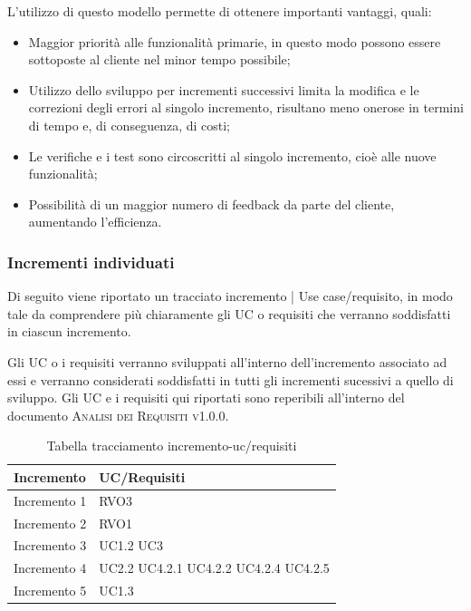 \documentclass[../piano_di_progetto.tex]{subfiles}
\begin{document}
L'utilizzo di questo modello permette di ottenere importanti vantaggi, quali:
\begin{itemize}
    \item Maggior priorità alle funzionalità primarie, in questo modo possono essere sottoposte al cliente nel minor tempo possibile;
    \item Utilizzo dello sviluppo per incrementi successivi limita la modifica e le correzioni degli errori al singolo incremento, risultano meno onerose in termini di tempo e, di conseguenza, di costi;
    \item Le verifiche e i test sono circoscritti al singolo incremento, cioè alle nuove funzionalità;
    \item Possibilità di un maggior numero di feedback da parte del cliente, aumentando l'efficienza.
\end{itemize}

\subsubsection{Incrementi individuati}
\label{ssub:incr_ind}

Di seguito viene riportato un tracciato incremento | Use case/requisito, in modo tale da comprendere più chiaramente gli UC o requisiti che verranno soddisfatti in ciascun incremento. 

Gli UC o i requisiti verranno sviluppati all'interno dell'incremento associato ad essi e verranno considerati soddisfatti in tutti gli incrementi sucessivi a quello di sviluppo. Gli UC e i requisiti qui riportati sono reperibili all'interno del documento \textsc{Analisi dei Requisiti v1.0.0}.
\begin{table}[!ht]
	\centering
	\begin{tabular}{|p{3cm}|p{3cm}|}
	\hline
	\rowcolor{lightgray}
	\textbf{Incremento} & \textbf{UC/Requisiti}\\
	\hline
        Incremento 1 & RVO3\\
        Incremento 2 & RVO1\\
        Incremento 3 & UC1.2  UC3 \\
        Incremento 4 & UC2.2 UC4.2.1 UC4.2.2 UC4.2.4 UC4.2.5\\
        Incremento 5 & UC1.3\\
	\hline	
	\end{tabular}
	\caption{Tabella tracciamento incremento-uc/requisiti}
\end{table}
\end{document}
